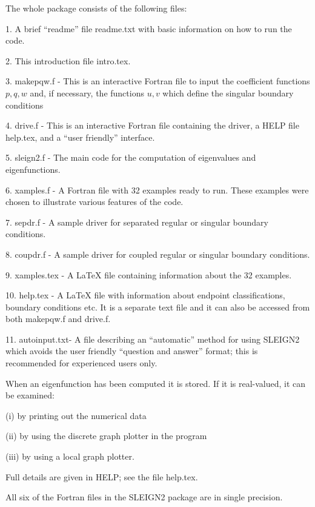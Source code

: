 \documentclass[12pt]{amsart}%
\theoremstyle{plain}
\numberwithin{equation}{section}
\numberwithin{theorem}{section}
\begin{document}
The whole package consists of the following files:

1. A brief ``readme'' file readme.txt with basic information on how to run the code.

2. This introduction file intro.tex.

3. makepqw.f - This is an interactive Fortran file to input the coefficient
functions $p,q,w$ and, if necessary, the functions $u,v$ which define the
singular boundary conditions

4. drive.f - This is an interactive Fortran file containing the driver, a HELP
file help.tex, and a ``user friendly'' interface.

5. sleign2.f - The main code for the computation of eigenvalues and eigenfunctions.

6. xamples.f - A Fortran file with 32 examples ready to run. These examples
were chosen to illustrate various features of the code.

7. sepdr.f - A sample driver for separated regular or singular boundary conditions.

8. coupdr.f - A sample driver for coupled regular or singular boundary conditions.

9. xamples.tex - A LaTeX file containing information about the 32 examples.

10. help.tex - A LaTeX file with information about endpoint classifications,
boundary conditions etc. It is a separate text file and it can also be
accessed from both makepqw.f and drive.f.

11. autoinput.txt- A file describing an ``automatic'' method for using SLEIGN2
which avoids the user friendly ``question and answer'' format; this is
recommended for experienced users only.

When an eigenfunction has been computed it is stored. If it is real-valued, it
can be examined:

(i) by printing out the numerical data

(ii) by using the discrete graph plotter in the program

(iii) by using a local graph plotter.

Full details are given in HELP; see the file help.tex.

All six of the Fortran files in the SLEIGN2 package are in single precision.
\end{document}
